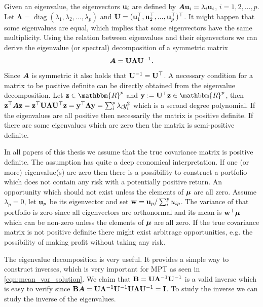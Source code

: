 \documentclass[]{book}\usepackage{knitr}
\begin{document}
Given an eigenvalue, the eigenvectors $\mathbf{u}_i$ are defined by $\mbox{\boldmath$A$} \mathbf{u}_i = \lambda_i \mathbf{u}_i$, $i=1,2,...,p$. 
Let $\boldsymbol{\Lambda} = \operatorname{diag}(\lambda_1, \lambda_2,...,\lambda_p)$ and $\mathbf{U}= (\mathbf{u}_1^\top, \mathbf{u}_2^\top, ..., \mathbf{u}_p^\top)^\top$. It might happen that some eigenvalues are equal, which implies that some eigenvectors have the same multiplicity.
Using the relation between eigenvalues and their eigenvectors we can derive the eigenvalue (or spectral) decomposition of a symmetric matrix 
\begin{equation}\label{eqn:eigenvalue_decomp}
	\mbox{\boldmath$A$} = \mathbf{U} \boldsymbol{\Lambda} \mathbf{U}^{-1}.
\end{equation}
Since $\mbox{\boldmath$A$}$ is symmetric it also holds that $\mathbf{U}^{-1} = \mathbf{U}^\top$.
A necessary condition for a matrix to be positive definite can be directly obtained from the eigenvalue decomposition. 
Let $\bz\in \mathbbm{R}^p$ and $\by := \bU^{\top} \bz \in \mathbbm{R}^p$, then $\mathbf{z}^\top \mbox{\boldmath$A$} \mathbf{z} = \mathbf{z}^\top \mathbf{U} \boldsymbol{\Lambda} \mathbf{U} ^{\top} \mathbf{z} = \mathbf{y}^\top \boldsymbol{\Lambda} \mathbf{y} = \sum_i^p \lambda_i y_i^2$ which is a second degree polynomial. 
If the eigenvalues are all positive then necessarily the matrix is positive definite. 
If there are some eigenvalues which are zero then the matrix is semi-positive definite. 

In all papers of this thesis we assume that the true covariance matrix is positive definite. 
The assumption has quite a deep economical interpretation.
If one (or more) eigenvalue(s) are zero then there is a possibility to construct a portfolio which does not contain any risk with a potentially positive return. 
An opportunity which should not exist unless the elements of $\mbox{\boldmath$\mu$}$ are all zero.
Assume $\lambda_p=0$, let $\mathbf{u}_p$ be its eigenvector and set $\mathbf{w} = \mathbf{u}_p / \sum_i^p u_{ip}$. 
The variance of that portfolio is zero since all eigenvectors are orthonormal and its mean is $\mathbf{w}^\top \mbox{\boldmath$\mu$}$ which can be non-zero unless the elements of $\mbox{\boldmath$\mu$}$ are all zero.
If the true covariance matrix is not positive definite there might exist arbitrage opportunities, e.g. the possibility of making profit without taking any risk.

The eigenvalue decomposition is very useful.
It provides a simple way to construct inverses, which is very important for MPT as seen in \eqref{eqn:mean_var_solution}.
We claim that $\mathbf{B} = \mathbf{U} \boldsymbol{\Lambda}^{-1} \mathbf{U}^{-1}$ is a valid inverse which is easy to verify since $\mathbf{B} \mbox{\boldmath$A$} = \mathbf{U} \boldsymbol{\Lambda}^{-1} \mathbf{U}^{-1} \mathbf{U} \boldsymbol{\Lambda} \mathbf{U}^{-1} = \mathbf{I}$. 
To study the inverse we can study the inverse of the eigenvalues.
\end{document}
